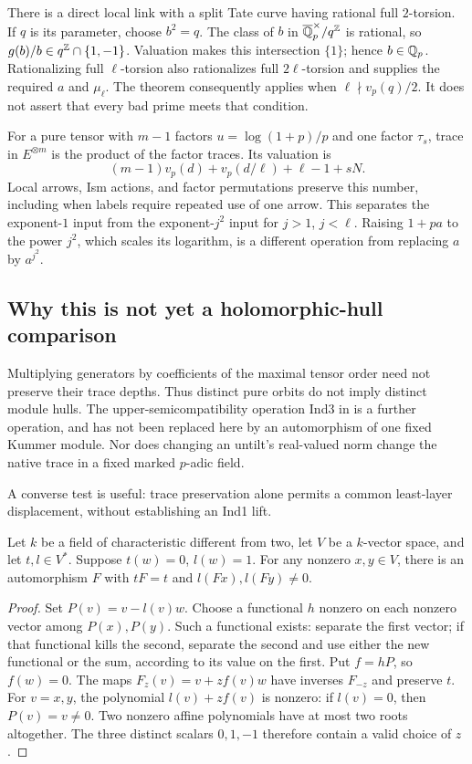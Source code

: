There is a direct local link with a split Tate curve having rational
full $2$-torsion. If $q$ is its parameter, choose $b^2=q$.
The class of $b$ in $\overline{\mathbb Q}_p^\times/q^\mathbb Z$ is rational, so
$g(b)/b\in q^\mathbb Z\cap\{1,-1\}$. Valuation makes this intersection
$\{1\}$; hence $b\in\mathbb Q_p$. Rationalizing full $\ell$-torsion also
rationalizes full $2\ell$-torsion and supplies the required $a$ and
$\mu_\ell$. The theorem consequently applies when
$\ell\nmid v_p(q)/2$. It does not assert that every bad prime meets
that condition.

For a pure tensor with $m-1$ factors $u=\log(1+p)/p$ and one factor
$\tau_s$, trace in $E^{\otimes m}$ is the product of the factor traces.
Its valuation is
\[
 (m-1)v_p(d)+v_p(d/\ell)+\ell-1+sN.
\]
Local arrows, Ism actions, and factor permutations preserve this number,
including when labels require repeated use of one arrow.
This separates the exponent-$1$ input from the exponent-$j^2$ input
for $j>1$, $j<\ell$. Raising $1+pa$ to the power $j^2$, which scales
its logarithm, is a different operation from replacing $a$ by $a^{j^2}$.

\subsection{Why this is not yet a holomorphic-hull comparison}

Multiplying generators by coefficients of the maximal tensor order
need not preserve their trace depths. Thus distinct pure orbits do not
imply distinct module hulls. The upper-semicompatibility operation Ind3
in \cite[Theorem~3.11(ii)]{IUT3} is a further operation, and has not
been replaced here by an automorphism of one fixed Kummer module.
Nor does changing an untilt's real-valued norm change the native trace
in a fixed marked $p$-adic field.

A converse test is useful: trace preservation alone permits a common
least-layer displacement, without establishing an Ind1 lift.
\begin{lemma}
\label{lem:trace-transvection}
Let $k$ be a field of characteristic different from two, let $V$ be a
$k$-vector space, and let $t,l\in V^*$. Suppose $t(w)=0$, $l(w)=1$.
For any nonzero $x,y\in V$, there is an automorphism $F$ with
$tF=t$ and $l(Fx),l(Fy)\ne0$.
\end{lemma}
\begin{proof}
Set $P(v)=v-l(v)w$. Choose a functional $h$ nonzero on each nonzero
vector among $P(x),P(y)$. Such a functional exists: separate the first
vector; if that functional kills the second, separate the second and
use either the new functional or the sum, according to its value on the
first. Put $f=hP$, so $f(w)=0$. The maps
$F_z(v)=v+zf(v)w$ have inverses $F_{-z}$ and preserve $t$.
For $v=x,y$, the polynomial $l(v)+zf(v)$ is nonzero: if $l(v)=0$,
then $P(v)=v\ne0$. Two nonzero affine polynomials have at most two
roots altogether. The three distinct scalars $0,1,-1$ therefore
contain a valid choice of $z$.
\end{proof}

